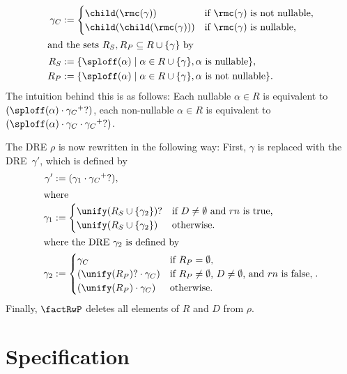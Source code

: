 \documentclass[a4paper,11pt, svgnames,titlepage]{article}
\newcommand{\rxp}{{^\mathtt{+}}}
\newcommand{\rxo}{\mathtt{?}}
\newcommand{\rxc}{\cdot}
\newcommand{\df}{:=}
\newcommand{\true}{\ensuremath{\operatorname{true}}\xspace}
\newcommand{\false}{\ensuremath{\operatorname{false}}\xspace}
\begin{document}
\begin{itemize}
\begin{align*}
	\gamma_{C}&\df \begin{cases}
		\child(\rmc(\gamma)) & \text{if $\rmc(\gamma)$ is not nullable,}\\ 
		\child(\child(\rmc(\gamma))) & \text{if $\rmc(\gamma)$ is nullable,} 
	\end{cases}\\
\intertext{and the sets $R_S, R_P\subseteq R\cup\{\gamma\}$ by}
	R_S&\df\{\sploff(\alpha)\mid\alpha\in R\cup\{\gamma\}, \alpha\text{ is nullable}\},\\
	R_P&\df\{\sploff(\alpha)\mid\alpha\in R\cup\{\gamma\}, \alpha\text{ is not nullable}\}.
\end{align*}
The intuition behind this is as follows: Each nullable $\alpha\in R$ is equivalent to $(\sploff(\alpha)\rxc \gamma_{C}\rxp\rxo)$, each non-nullable $\alpha\in R$ is equivalent to $(\sploff(\alpha)\rxc \gamma_{C}\rxc\gamma_{C}\rxp\rxo)$.

The DRE $\rho$ is now rewritten in the following way: First, $\gamma$ is replaced with the DRE~$\gamma'$, which is defined by
\begin{align*}
	\gamma'&\df (\gamma_1\rxc\gamma_{C}\rxp\rxo),\\
	\shortintertext{where}	
	\gamma_1&\df \begin{cases}
		\unify(R_S\cup\{\gamma_2\})\rxo &  \text{if $D\neq \emptyset$ and $rn$ is $\true$,}\\
		\unify(R_S\cup\{\gamma_2\}) & \text{otherwise.}
	\end{cases}\\
	\shortintertext{where the DRE~$\gamma_2$ is defined by }
	\gamma_2&\df \begin{cases}
		\gamma_{C} & \text{if $R_P=\emptyset$},\\
		(\unify(R_{P})\rxo\rxc\gamma_{C})&\text{if $R_P\neq \emptyset$, $D\neq\emptyset$, and $rn$ is $\false$},\\
		(\unify(R_{P})\rxc\gamma_{C})&\text{otherwise}.
	\end{cases}.
\end{align*}
Finally, $\factRwP$ deletes all elements of $R$ and $D$ from $\rho$.
\end{itemize}
\section{Specification}\label{sec:spec}
\end{document}
